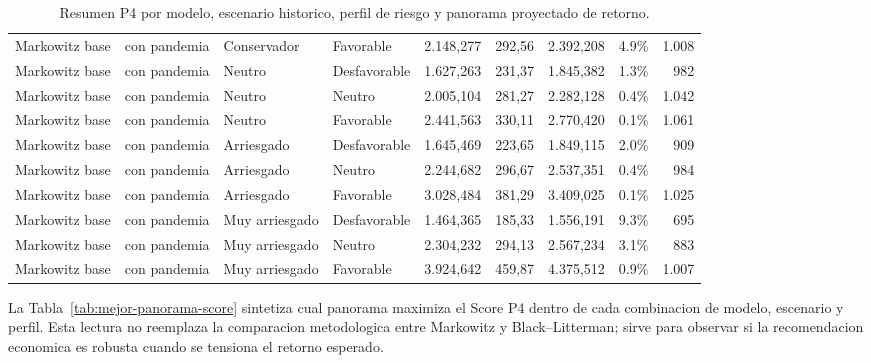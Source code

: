 \documentclass[11pt]{article}
\begin{document}
\begin{table}[H]
{\begin{tabular}{llllrrrrr}
Markowitz base & con pandemia & Conservador & Favorable & 2.148,277 & 292,56 & 2.392,208 & 4.9\% & 1.008 \\
Markowitz base & con pandemia & Neutro & Desfavorable & 1.627,263 & 231,37 & 1.845,382 & 1.3\% & 982 \\
Markowitz base & con pandemia & Neutro & Neutro & 2.005,104 & 281,27 & 2.282,128 & 0.4\% & 1.042 \\
Markowitz base & con pandemia & Neutro & Favorable & 2.441,563 & 330,11 & 2.770,420 & 0.1\% & 1.061 \\
Markowitz base & con pandemia & Arriesgado & Desfavorable & 1.645,469 & 223,65 & 1.849,115 & 2.0\% & 909 \\
Markowitz base & con pandemia & Arriesgado & Neutro & 2.244,682 & 296,67 & 2.537,351 & 0.4\% & 984 \\
Markowitz base & con pandemia & Arriesgado & Favorable & 3.028,484 & 381,29 & 3.409,025 & 0.1\% & 1.025 \\
Markowitz base & con pandemia & Muy arriesgado & Desfavorable & 1.464,365 & 185,33 & 1.556,191 & 9.3\% & 695 \\
Markowitz base & con pandemia & Muy arriesgado & Neutro & 2.304,232 & 294,13 & 2.567,234 & 3.1\% & 883 \\
Markowitz base & con pandemia & Muy arriesgado & Favorable & 3.924,642 & 459,87 & 4.375,512 & 0.9\% & 1.007 \\
\bottomrule
\end{tabular}%
}
\caption{Resumen P4 por modelo, escenario historico, perfil de riesgo y panorama proyectado de retorno.}
\label{tab:p4-panoramas-resumen}
\end{table}

La Tabla~\ref{tab:mejor-panorama-score} sintetiza cual panorama maximiza el Score P4 dentro de cada combinacion de modelo, escenario y perfil. Esta lectura no reemplaza la comparacion metodologica entre Markowitz y Black--Litterman; sirve para observar si la recomendacion economica es robusta cuando se tensiona el retorno esperado.
\end{document}
